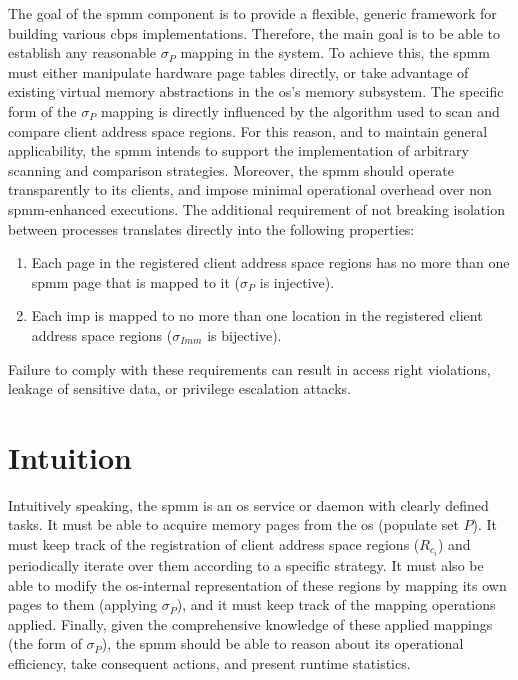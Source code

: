 The goal of the \ac{spmm} component is to provide a flexible, generic framework for building various \ac{cbps} implementations.
Therefore, the main goal is to be able to establish any reasonable $\sigma_{P}$ mapping in the system.
To achieve this, the \ac{spmm} must either manipulate hardware page tables directly, or take advantage of existing virtual memory abstractions in the \ac{os}'s memory subsystem.
The specific form of the $\sigma_{P}$ mapping is directly influenced by the algorithm used to scan and compare client address space regions.
For this reason, and to maintain general applicability, the \ac{spmm} intends to support the implementation of arbitrary scanning and comparison strategies.
Moreover, the \ac{spmm} should operate transparently to its clients, and impose minimal operational overhead over non \ac{spmm}-enhanced executions.
The additional requirement of not breaking isolation between processes translates directly into the following properties:

\begin{enumerate}
  \item Each page in the registered client address space regions has no more than one \ac{spmm} page that is mapped to it ($\sigma_{P}$ is injective).
  \item Each \ac{imp} is mapped to no more than one location in the registered client address space regions ($\sigma_{Imm} $ is bijective).
\end{enumerate}

Failure to comply with these requirements can result in access right violations, leakage of sensitive data, or privilege escalation attacks.

\section{Intuition}
\label{sec:intuition}

Intuitively speaking, the \ac{spmm} is an \ac{os} service or daemon with clearly defined tasks.
It must be able to acquire memory pages from the \ac{os} (populate set $P$).
It must keep track of the registration of client address space regions ($R_{c_i}$) and periodically iterate over them according to a specific strategy.
It must also be able to modify the \ac{os}-internal representation of these regions by mapping its own pages to them (applying $\sigma_P$), and it must keep track of the mapping operations applied.
Finally, given the comprehensive knowledge of these applied mappings (the form of $\sigma_P$), the \ac{spmm} should be able to reason about its operational efficiency, take consequent actions, and present runtime statistics.

